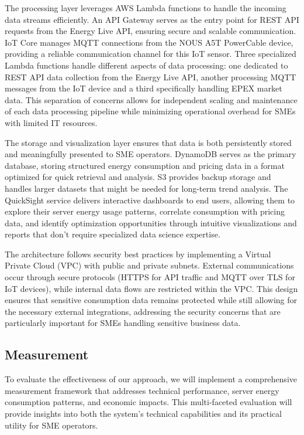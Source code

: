 The processing layer leverages AWS Lambda functions to handle the incoming data streams
efficiently. An API Gateway serves as the entry point for REST API requests from the Energy Live API,
ensuring secure and scalable communication. IoT Core manages MQTT connections from the NOUS A5T
PowerCable device, providing a reliable communication channel for this IoT sensor.
Three specialized Lambda functions handle different aspects of data processing: one dedicated to
REST API data collection from the Energy Live API, another processing MQTT messages from the IoT device
and a third specifically handling EPEX market data. This separation of concerns allows for
independent scaling and maintenance of each data processing pipeline while minimizing operational
overhead for SMEs with limited IT resources.

The storage and visualization layer ensures that data is both persistently stored and meaningfully
presented to SME operators. DynamoDB serves as the primary database, storing structured energy
consumption and pricing data in a format optimized for quick retrieval and analysis. S3 provides
backup storage and handles larger datasets that might be needed for long-term trend analysis. The
QuickSight service delivers interactive dashboards to end users, allowing them to explore their
server energy usage patterns, correlate consumption with pricing data, and identify optimization
opportunities through intuitive visualizations and reports that don't require specialized data
science expertise.

The architecture follows security best practices by implementing a Virtual Private Cloud (VPC) with
public and private subnets. External communications occur through secure protocols
(HTTPS for API traffic and MQTT over TLS for IoT devices), while internal data flows are restricted
within the VPC. This design ensures that sensitive consumption data remains protected while still
allowing for the necessary external integrations, addressing the security concerns that are
particularly important for SMEs handling sensitive business data.

\subsection{Measurement}
To evaluate the effectiveness of our approach, we will implement a comprehensive
measurement framework that addresses technical performance, server energy
consumption patterns, and economic impacts. This multi-faceted evaluation will
provide insights into both the system's technical capabilities and its practical
utility for SME operators.

